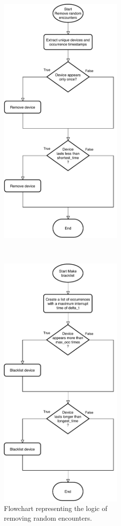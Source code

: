 \begin{figure}
\begin{minipage}[b]{8.5cm}
\centering
\includegraphics[width=0.55\textwidth]{images/flowrandom}
\caption{Flowchart representing the logic of\\removing random encounters.}
\label{fig:flowrandom}
\end{minipage}
\ \hspace{2mm} \
\begin{minipage}[b]{8.5cm}
\centering
\includegraphics[width=0.55\textwidth]{images/flowblacklist}

\end{minipage}
\end{figure}
